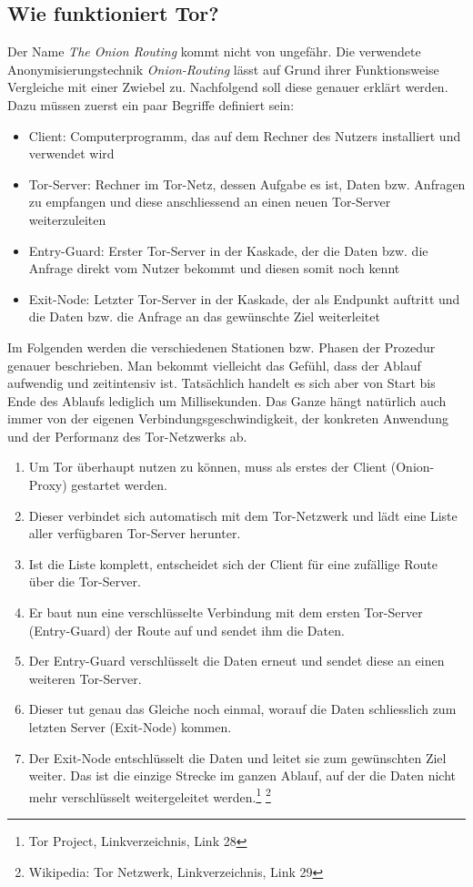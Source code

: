\subsection{Wie funktioniert Tor?}
Der Name \textit{The Onion Routing} kommt nicht von ungefähr. Die verwendete Anonymisierungstechnik \textit{Onion-Routing} lässt auf Grund ihrer Funktionsweise Vergleiche mit einer Zwiebel zu. Nachfolgend soll diese genauer erklärt werden. Dazu müssen zuerst ein paar Begriffe definiert sein:
\begin{itemize}
\item Client: Computerprogramm, das auf dem Rechner des Nutzers installiert und verwendet wird
\item Tor-Server: Rechner im Tor-Netz, dessen Aufgabe es ist, Daten bzw. Anfragen zu empfangen und diese anschliessend an einen neuen Tor-Server weiterzuleiten
\item Entry-Guard: Erster Tor-Server in der Kaskade, der die Daten bzw. die Anfrage direkt vom Nutzer bekommt und diesen somit noch kennt
\item Exit-Node: Letzter Tor-Server in der Kaskade, der als Endpunkt auftritt und die Daten bzw. die Anfrage an das gewünschte Ziel weiterleitet
\end{itemize}

Im Folgenden werden die verschiedenen Stationen bzw. Phasen der Prozedur genauer beschrieben. Man bekommt vielleicht das Gefühl, dass der Ablauf aufwendig und zeitintensiv ist. Tatsächlich handelt es sich aber von Start bis Ende des Ablaufs lediglich um Millisekunden. Das Ganze hängt natürlich auch immer von der eigenen Verbindungsgeschwindigkeit, der konkreten Anwendung und der Performanz des Tor-Netzwerks ab.

\begin{enumerate}
\item Um Tor überhaupt nutzen zu können, muss als erstes der  Client (Onion-Proxy) gestartet werden.
\item Dieser verbindet sich automatisch mit dem Tor-Netzwerk und lädt eine Liste aller verfügbaren Tor-Server herunter.
\item Ist die Liste komplett, entscheidet sich der Client für eine zufällige Route über die Tor-Server.
\item Er baut nun eine verschlüsselte Verbindung mit dem ersten Tor-Server (Entry-Guard) der Route auf und sendet ihm die Daten.
\item Der Entry-Guard verschlüsselt die Daten erneut und sendet diese an einen weiteren Tor-Server.
\item Dieser tut genau das Gleiche noch einmal, worauf die Daten schliesslich zum letzten Server (Exit-Node) kommen.
\item Der Exit-Node entschlüsselt die Daten und leitet sie zum gewünschten Ziel weiter. Das ist die einzige Strecke im ganzen Ablauf, auf der die Daten nicht mehr verschlüsselt weitergeleitet werden.\footnote{Tor Project, Linkverzeichnis, Link 28}
\footnote{Wikipedia: Tor Netzwerk, Linkverzeichnis, Link 29}
\end{enumerate}

